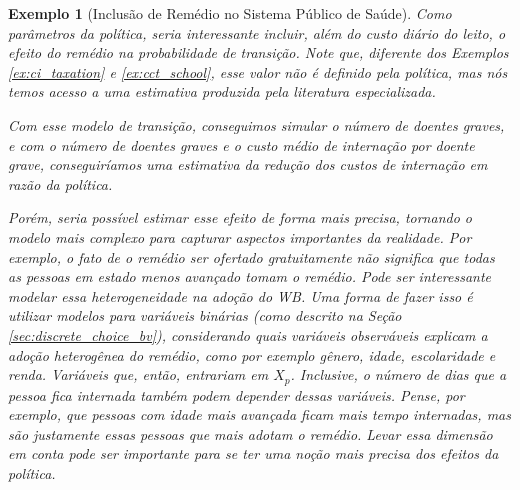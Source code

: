 \documentclass[12pt]{article}
\theoremstyle{break}
\newtheorem{exemplo}{Exemplo}
\begin{document}
\begin{exemplo}[Inclusão de Remédio no Sistema Público de Saúde]
Como parâmetros da política, seria interessante incluir, além do custo diário do leito, o efeito do remédio na probabilidade de transição. Note que, diferente dos Exemplos \ref{ex:ci_taxation} e \ref{ex:cct_school}, esse valor não é definido pela política, mas nós temos acesso a uma estimativa produzida pela literatura especializada.

Com esse modelo de transição, conseguimos simular o número de doentes graves, e com o número de doentes graves e o custo médio de internação por doente grave, conseguiríamos uma estimativa da redução dos custos de internação em razão da política. 

Porém, seria possível estimar esse efeito de forma mais precisa, tornando o modelo mais complexo para capturar aspectos importantes da realidade. Por exemplo, o fato de o remédio ser ofertado gratuitamente não significa que todas as pessoas em estado menos avançado tomam o remédio. Pode ser interessante modelar essa heterogeneidade na adoção do WB. Uma forma de fazer isso é utilizar modelos para variáveis binárias (como descrito na Seção \ref{sec:discrete_choice_bv}), considerando quais variáveis observáveis explicam a adoção heterogênea do remédio, como por exemplo gênero, idade, escolaridade e renda. Variáveis que, então, entrariam em $X_p$. Inclusive, o número de dias que a pessoa fica internada também podem depender dessas variáveis. Pense, por exemplo, que pessoas com idade mais avançada ficam mais tempo internadas, mas são justamente essas pessoas que mais adotam o remédio. Levar essa dimensão em conta pode ser importante para se ter uma noção mais precisa dos efeitos da política. 
\end{exemplo}

\end{document}
